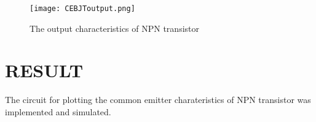 \begin{figure}[h]
\centering
\texttt{[image: CEBJToutput.png]}
\caption{The output characteristics of NPN transistor }
\label{CEBJToutput}
\end{figure}


\section*{RESULT}
The circuit for plotting the common emitter charateristics of NPN transistor was implemented and simulated.


